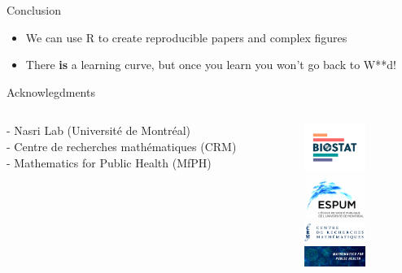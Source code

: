\documentclass[
  ignorenonframetext,
]{beamer}
\providecommand{\tightlist}{%
  \setlength{\itemsep}{0pt}\setlength{\parskip}{0pt}}\usepackage{longtable,booktabs,array}
\begin{document}
\begin{frame}{Conclusion}
\protect\hypertarget{conclusion}{}
\begin{itemize}[<+->]
\tightlist
\item
  We can use R to create reproducible papers and complex figures
\item
  There \textbf{is} a learning curve, but once you learn you won't go
  back to W**d!
\end{itemize}
\end{frame}

\begin{frame}{Acknowlegdments}
\protect\hypertarget{acknowlegdments}{}
\begin{columns}
\begin{column}{0.6\textwidth}
\footnotesize
- Nasri Lab (Université de Montréal) \\
- Centre de recherches mathématiques (CRM)\\
- Mathematics for Public Health (MfPH)

\end{column}
\begin{column}{0.4\textwidth}
\vspace{0.01em}
\centering
        \includegraphics[width=2cm]{figures/logo.png}\\
        \includegraphics[width=2cm]{figures/espum.jpg}\\
        \includegraphics[width=2cm]{figures/crm.png}\\
         \includegraphics[width=2cm]{figures/mfph.png}\\
         
\end{column}
\end{columns}
\end{frame}
\end{document}
